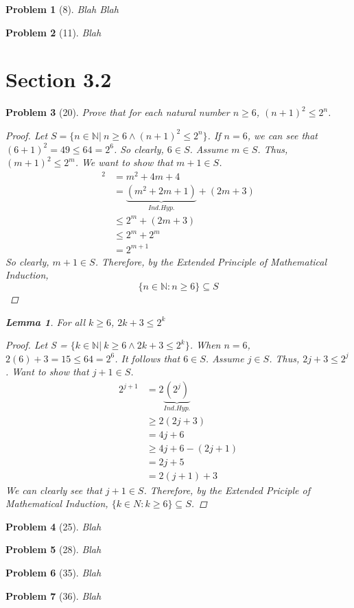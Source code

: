\documentclass{article}
\theoremstyle{problem}
\newtheorem{prob}{Problem}
\theoremstyle{plain}
\newtheorem{lem}{Lemma}
\begin{document}
  \begin{prob}[8]
    Blah Blah
  \end{prob}

  \begin{prob}[11]
    Blah
  \end{prob}
  \section*{Section 3.2}
  \begin{prob}[20]
    Prove that for each natural number $n \geq 6$, $(n + 1)^2 \leq 2^n$.
    \begin{multicols}{2}      

      \begin{proof}
        Let $S = \{n \in \mathbb{N} |\ n \geq 6 \wedge (n + 1)^2 \leq 2^n\}$. If $n = 6$, we can see that $(6+1)^2 = 49 \leq 64 = 2^6$. So clearly, $6 \in S$. Assume $m \in S$. Thus, $(m + 1)^2 \leq 2^m$. We want to show that $m + 1 \in S$.
        \begin{align*}
          [(m+1) + 1]^2 &= m^2 + 4m + 4\\
          &= \underbrace{(m^2 + 2m + 1)}_{Ind. Hyp.} + (2m + 3)\\
          &\leq 2^m + (2m + 3)\\
          &\leq 2^m + 2^m \tag*{(Lemma)}\\
          &=2^{m+1}
        \end{align*}
        So clearly, $m + 1 \in S$. Therefore, by the Extended Principle of Mathematical Induction, $$\{n \in \mathbb{N} : n \geq 6\} \subseteq S$$
      \end{proof}     
      \vfill
      \columnbreak
      \begin{lem}
        For all $k \geq 6$, $2k + 3 \leq 2^k$
        \begin{proof}
          Let S = $\{k \in \mathbb{N} |\ k \geq 6 \wedge 2k + 3 \leq 2^k\}$. When $n = 6$, $2(6) + 3 = 15 \leq 64 = 2^6$. It follows that $6 \in S$. Assume $j \in S$. Thus, $2j + 3 \leq 2^j$. Want to show that $j + 1 \in S$.
          \begin{align*}
            2^{j+1} &= 2\underbrace{(2^j)}_{Ind. Hyp.}\\
            &\geq 2(2j+3)\\
            &= 4j + 6\\
            &\geq 4j + 6 - (2j + 1)\\
            &= 2j+5\\
            &= 2(j+1) + 3
          \end{align*}
          We can clearly see that $j + 1 \in S$. Therefore, by the Extended Priciple of Mathematical Induction, $\{k \in N : k \geq 6\} \subseteq S$.
        \end{proof}
      \end{lem}
    \end{multicols}
  \end{prob}
  \begin{prob}[25]
    Blah
  \end{prob}
  \begin{prob}[28]
    Blah
  \end{prob}
  \begin{prob}[35]
    Blah
  \end{prob}
  \begin{prob}[36]
    Blah
  \end{prob}
\end{document}
